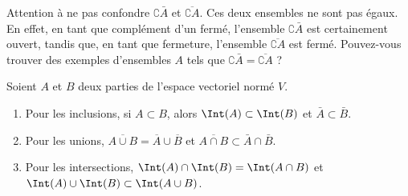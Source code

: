 Attention à ne pas confondre \( \complement \bar A\) et \( \overline{ \complement A }\). Ces deux ensembles ne sont pas égaux. En effet, en tant que complément d'un fermé, l'ensemble \( \complement \bar A\) est certainement ouvert, tandis que, en tant que fermeture, l'ensemble \( \overline{ \complement A }\) est fermé. Pouvez-vous trouver des exemples d'ensembles \( A\) tels que \( \complement \bar A=\overline{ \complement A }\) ?

\begin{proposition}     \label{PROPooRAZUooVMxPic}
	Soient \( A\) et \( B\) deux parties de l'espace vectoriel normé \( V\).
	\begin{enumerate}
		\item
		      Pour les inclusions, si \( A\subset B\), alors \( \Int(A)\subset\Int(B)\) et \( \bar A\subset\bar B\).
		\item
		      Pour les unions, \( \overline{ A\cup B }=\overline{ A }\cup\overline{ B }\) et \( \overline{ A\cap B }\subset\bar A\cap\bar B\).
		\item
		      Pour les intersections, \( \Int(A)\cap\Int(B)=\Int(A\cap B)\) et \( \Int(A)\cup\Int(B)\subset\Int(A\cup B)\).
	\end{enumerate}
\end{proposition}

